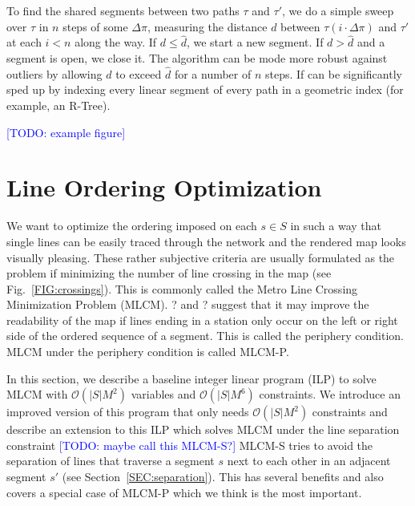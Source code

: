 \documentclass{llncs}
\newcommand\todo[1]{\textcolor{blue}{[TODO: #1]}}
\begin{document}
To find the shared segments between two paths $\tau$ and $\tau'$, we do a simple sweep over $\tau$ in $n$ steps of some $\Delta\pi$, measuring the distance $d$ between $\tau(i\cdot\Delta\pi)$ and $\tau'$ at each $i < n$ along the way. If $d \leq \hat{d}$, we start a new segment. If $d > \hat{d}$ and a segment is open, we close it. The algorithm can be mode more robust against outliers by allowing $d$ to exceed $\hat{d}$ for a number of $n$ steps. If can be significantly sped up by indexing every linear segment of every path in a geometric index (for example, an R-Tree).

\todo{example figure}
% 

%
\section{Line Ordering Optimization}\label{SEC:ordering}
%
We want to optimize the ordering imposed on each $s \in S$ in such a way that single lines can be easily traced through the network and the rendered map looks visually pleasing. These rather subjective criteria are usually formulated as the problem if minimizing the number of line crossing in the map (see Fig.~\ref{FIG:crossings}). This is commonly called the Metro Line Crossing Minimization Problem (MLCM). ? and ? suggest that it may improve the readability of the map if lines ending in a station only occur on the left or right side of the ordered sequence of a segment. This is called the periphery condition. MLCM under the periphery condition is called MLCM-P.

In this section, we describe a baseline integer linear program (ILP) to solve MLCM with $\mathcal{O}(|S|M^{2})$ variables and $\mathcal{O}(|S|M^{6})$ constraints.
We introduce an improved version of this program that only needs $\mathcal{O}(|S|M^2)$ constraints and describe an extension to this ILP which solves MLCM under the line separation constraint \todo{maybe call this MLCM-S?}
MLCM-S tries to avoid the separation of lines that traverse a segment $s$ next to each other in an adjacent segment $s'$ (see Section~\ref{SEC:separation}).
This has several benefits and also covers a special case of MLCM-P which we think is the most important.

%
\end{document}
